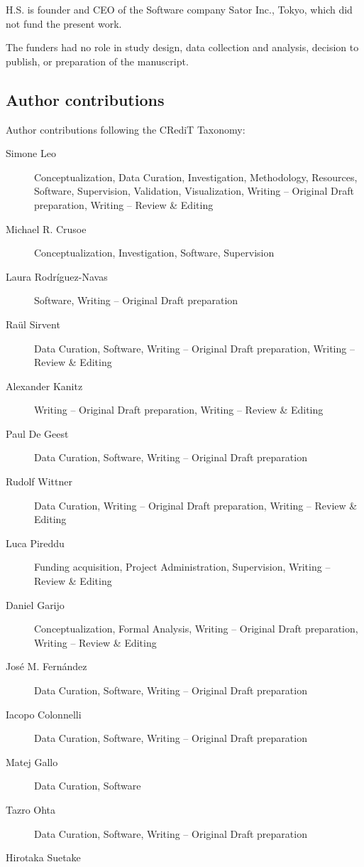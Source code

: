 \documentclass[10pt,letterpaper]{article}
\providecommand{\DIFaddbegin}{} %
\providecommand{\DIFaddend}{} %
\newcommand{\DIFaddincludegraphics}[2][]{{\color{blue}\fbox{\DIFOincludegraphics[#1]{#2}}}} %
\DeclareRobustCommand{\DIFaddbegin}{\DIFOaddbegin \let\includegraphics\DIFaddincludegraphics} %
\DeclareRobustCommand{\DIFaddend}{\DIFOaddend \let\includegraphics\DIFOincludegraphics} %
\begin{document}
H.S. is founder and CEO of the Software company Sator Inc., Tokyo, which did not fund the present work.

The funders had no role in study design, data collection and analysis, decision to publish, or preparation of the manuscript.
\fi

\DIFaddbegin \iffalse
\DIFaddend \subsection*{Author contributions}
Author contributions following the CRediT Taxonomy:

\begin{description}
\item[Simone Leo]
Conceptualization, Data Curation, Investigation, Methodology, Resources, Software, Supervision, Validation, Visualization, Writing -- Original Draft preparation, Writing -- Review \& Editing
\item[Michael R. Crusoe]
Conceptualization, Investigation, Software, Supervision
\item[Laura Rodríguez-Navas]
Software, Writing -- Original Draft preparation
\item[Raül Sirvent]
Data Curation, Software, Writing -- Original Draft preparation, Writing -- Review \& Editing
\item[Alexander Kanitz]
Writing -- Original Draft preparation, Writing -- Review \& Editing
\item[Paul De Geest]
Data Curation, Software, Writing -- Original Draft preparation
\item[Rudolf Wittner]
Data Curation, Writing -- Original Draft preparation, Writing -- Review \& Editing
\item[Luca Pireddu]
Funding acquisition, Project Administration, Supervision, Writing -- Review \& Editing
\item[Daniel Garijo]
Conceptualization, Formal Analysis, Writing -- Original Draft preparation, Writing -- Review \& Editing
\item[José M. Fernández]
Data Curation, Software, Writing -- Original Draft preparation
\item[Iacopo Colonnelli]
Data Curation, Software, Writing -- Original Draft preparation
\item[Matej Gallo]
Data Curation, Software
\item[Tazro Ohta]
Data Curation, Software, Writing -- Original Draft preparation
\item[Hirotaka Suetake]

\end{description}
\end{document}
